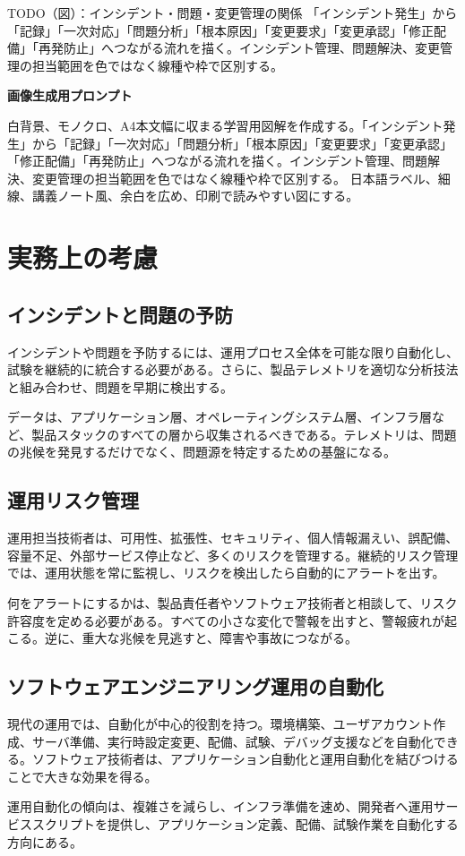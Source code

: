 \documentclass[uplatex,dvipdfmx,a4paper,10pt]{jsarticle}
\newcommand{\todoprompt}[2]{%
\begin{notebox}{TODO（図）：#1}
#2

\textbf{画像生成用プロンプト}

白背景、モノクロ、A4本文幅に収まる学習用図解を作成する。#2 日本語ラベル、細線、講義ノート風、余白を広め、印刷で読みやすい図にする。
\end{notebox}
}
\begin{document}
\todoprompt{インシデント・問題・変更管理の関係}{「インシデント発生」から「記録」「一次対応」「問題分析」「根本原因」「変更要求」「変更承認」「修正配備」「再発防止」へつながる流れを描く。インシデント管理、問題解決、変更管理の担当範囲を色ではなく線種や枠で区別する。}

\section{実務上の考慮}

\subsection{インシデントと問題の予防}

インシデントや問題を予防するには、運用プロセス全体を可能な限り自動化し、試験を継続的に統合する必要がある。さらに、製品テレメトリを適切な分析技法と組み合わせ、問題を早期に検出する。

データは、アプリケーション層、オペレーティングシステム層、インフラ層など、製品スタックのすべての層から収集されるべきである。テレメトリは、問題の兆候を発見するだけでなく、問題源を特定するための基盤になる。

\subsection{運用リスク管理}

運用担当技術者は、可用性、拡張性、セキュリティ、個人情報漏えい、誤配備、容量不足、外部サービス停止など、多くのリスクを管理する。継続的リスク管理では、運用状態を常に監視し、リスクを検出したら自動的にアラートを出す。

何をアラートにするかは、製品責任者やソフトウェア技術者と相談して、リスク許容度を定める必要がある。すべての小さな変化で警報を出すと、警報疲れが起こる。逆に、重大な兆候を見逃すと、障害や事故につながる。

\subsection{ソフトウェアエンジニアリング運用の自動化}

現代の運用では、自動化が中心的役割を持つ。環境構築、ユーザアカウント作成、サーバ準備、実行時設定変更、配備、試験、デバッグ支援などを自動化できる。ソフトウェア技術者は、アプリケーション自動化と運用自動化を結びつけることで大きな効果を得る。

運用自動化の傾向は、複雑さを減らし、インフラ準備を速め、開発者へ運用サービススクリプトを提供し、アプリケーション定義、配備、試験作業を自動化する方向にある。
\end{document}
